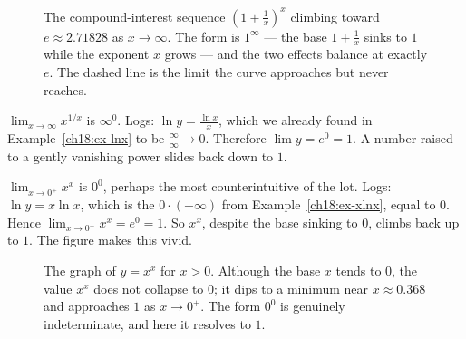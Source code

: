 \begin{figure}[H]
\centering
{}
\caption{The compound-interest sequence $\left(1+\tfrac1x\right)^x$ climbing toward
$e\approx 2.71828$ as $x\to\infty$. The form is $1^\infty$ --- the base $1+\tfrac1x$
sinks to $1$ while the exponent $x$ grows --- and the two effects balance at exactly
$e$. The dashed line is the limit the curve approaches but never reaches.}
\label{ch18:fig-e}
\end{figure}

\begin{example}[An $\infty^{0}$]\label{ch18:ex-inf0}
$\displaystyle\lim_{x\to\infty}x^{1/x}$ is $\infty^{0}$. Logs:
$\ln y=\tfrac{\ln x}{x}$, which we already found in Example~\ref{ch18:ex-lnx} to
be $\tfrac{\infty}{\infty}\to 0$. Therefore $\lim y=e^{0}=1$. A number raised to a
gently vanishing power slides back down to $1$.
\end{example}

\begin{example}[A $0^{0}$]\label{ch18:ex-00}
$\displaystyle\lim_{x\to 0^+}x^{x}$ is $0^{0}$, perhaps the most counterintuitive of
the lot. Logs: $\ln y=x\ln x$, which is the $0\cdot(-\infty)$ from
Example~\ref{ch18:ex-xlnx}, equal to $0$. Hence $\lim_{x\to0^+}x^x=e^{0}=1$. So $x^x$,
despite the base sinking to $0$, climbs back up to $1$. The figure makes this vivid.
\end{example}

\begin{figure}[H]
\centering
{}
\caption{The graph of $y=x^x$ for $x>0$. Although the base $x$ tends to $0$, the value
$x^x$ does not collapse to $0$; it dips to a minimum near $x\approx 0.368$ and
approaches $1$ as $x\to 0^+$. The form $0^0$ is genuinely indeterminate, and here it
resolves to $1$.}
\label{ch18:fig-xx}
\end{figure}

